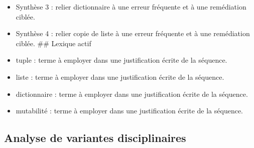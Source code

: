 \begin{itemize}
  remédiation ciblée.
\item
  Synthèse 3 : relier dictionnaire à une erreur fréquente et à une
  remédiation ciblée.
\item
  Synthèse 4 : relier copie de liste à une erreur fréquente et à une
  remédiation ciblée. \#\# Lexique actif
\item
  tuple : terme à employer dans une justification écrite de la séquence.
\item
  liste : terme à employer dans une justification écrite de la séquence.
\item
  dictionnaire : terme à employer dans une justification écrite de la
  séquence.
\item
  mutabilité : terme à employer dans une justification écrite de la
  séquence.
\end{itemize}

\subsection{Analyse de variantes disciplinaires}

